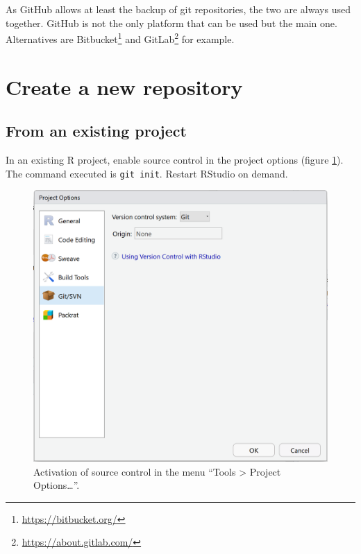 \documentclass[
  12pt,
  american,
  a4paper,
  extrafontsizes,onecolumn,openright
  ]{memoir}
\begin{document}
As GitHub allows at least the backup of git repositories, the two are always used together.
GitHub is not the only platform that can be used but the main one.
Alternatives are Bitbucket\footnote{\url{https://bitbucket.org/}} and GitLab\footnote{\url{https://about.gitlab.com/}} for example.

\hypertarget{sec:creerdepot}{%
\section{Create a new repository}\label{sec:creerdepot}}

\hypertarget{from-an-existing-project}{%
\subsection{From an existing project}\label{from-an-existing-project}}

In an existing R project, enable source control in the project options (figure \ref{fig:git-Project}).
The command executed is \texttt{git\ init}.
Restart RStudio on demand.



\scriptsize

\begin{figure}

{\centering \includegraphics[width=0.8\linewidth]{images/git-Project} 

}

\caption{Activation of source control in the menu \enquote{Tools \textgreater{} Project Options\ldots{}}.}\label{fig:git-Project}
\end{figure}
\end{document}
